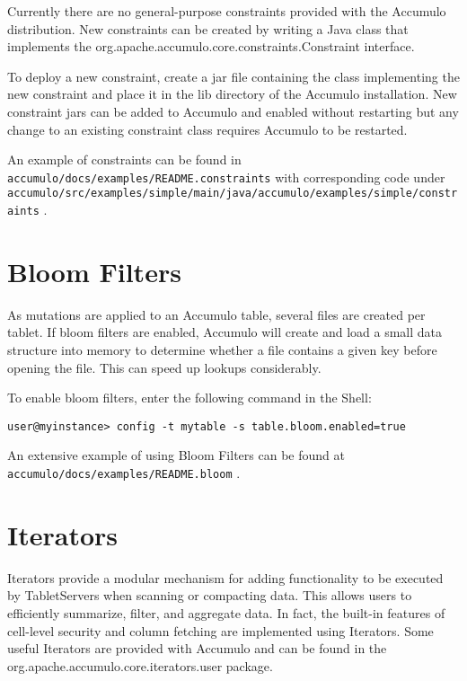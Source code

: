 Currently there are no general-purpose constraints provided with the Accumulo
distribution. New constraints can be created by writing a Java class that implements
the org.apache.accumulo.core.constraints.Constraint interface.

To deploy a new constraint, create a jar file containing the class implementing the
new constraint and place it in the lib directory of the Accumulo installation. New
constraint jars can be added to Accumulo and enabled without restarting but any
change to an existing constraint class requires Accumulo to be restarted.

An example of constraints can be found in\\
\texttt{accumulo/docs/examples/README.constraints} with corresponding code under\\
\texttt{accumulo/src/examples/simple/main/java/accumulo/examples/simple/constraints} .

\section{Bloom Filters}
As mutations are applied to an Accumulo table, several files are created per tablet. If
bloom filters are enabled, Accumulo will create and load a small data structure into
memory to determine whether a file contains a given key before opening the file.
This can speed up lookups considerably.

To enable bloom filters, enter the following command in the Shell:

\small
\begin{verbatim}
user@myinstance> config -t mytable -s table.bloom.enabled=true
\end{verbatim}
\normalsize

An extensive example of using Bloom Filters can be found at\\
\texttt{accumulo/docs/examples/README.bloom} .

\section{Iterators}
Iterators provide a modular mechanism for adding functionality to be executed by
TabletServers when scanning or compacting data. This allows users to efficiently
summarize, filter, and aggregate data. In fact, the built-in features of cell-level
security and column fetching are implemented using Iterators.
Some useful Iterators are provided with Accumulo and can be found in the org.apache.accumulo.core.iterators.user package.


